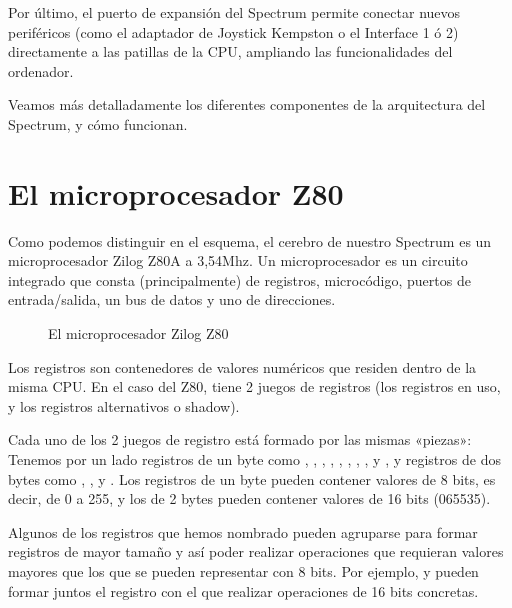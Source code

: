 \documentclass[letterpaper,10pt,spanish]{sphinxmanual}
\begin{document}
Por último, el puerto de expansión del Spectrum permite conectar nuevos periféricos (como el adaptador de Joystick Kempston o el Interface 1 ó 2) directamente a las patillas de la CPU, ampliando las funcionalidades del ordenador.

Veamos más detalladamente los diferentes componentes de la arquitectura del Spectrum, y cómo funcionan.


\section{El microprocesador Z80}
\label{\detokenize{03_arquitectura/arquitectura:el-microprocesador-z80}}
Como podemos distinguir en el esquema, el cerebro de nuestro Spectrum es un microprocesador Zilog Z80A a 3,54Mhz. Un microprocesador es un circuito integrado que consta (principalmente) de registros, microcódigo, puertos de entrada/salida, un bus de datos y uno de direcciones.

\begin{figure}[htbp]
\centering
\capstart

\noindent{}
\caption{El microprocesador Zilog Z80}\label{\detokenize{03_arquitectura/arquitectura:id2}}\end{figure}

Los registros son contenedores de valores numéricos que residen dentro de la misma CPU. En el caso del Z80, tiene 2 juegos de registros (los registros en uso, y los registros alternativos o shadow).

Cada uno de los 2 juegos de registro está formado por las mismas «piezas»: Tenemos por un lado registros de un byte como , , , , , , , ,  y , y registros de dos bytes como , ,  y . Los registros de un byte pueden contener valores de 8 bits, es decir, de 0 a 255, y los de 2 bytes pueden contener valores de 16 bits (0\sphinxhyphen{}65535).

Algunos de los registros que hemos nombrado pueden agruparse para formar registros de mayor tamaño y así poder realizar operaciones que requieran valores mayores que los que se pueden representar con 8 bits. Por ejemplo,  y  pueden formar juntos el registro  con el que realizar operaciones de 16 bits concretas.
\end{document}
